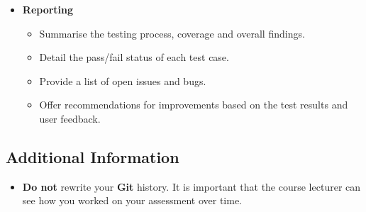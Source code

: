 \documentclass{article}
\begin{document}
\begin{itemize}
    \item \textbf{Reporting}
    \begin{itemize}
        \item Summarise the testing process, coverage and overall findings.
        \item Detail the pass/fail status of each test case.
        \item Provide a list of open issues and bugs.
        \item Offer recommendations for improvements based on the test results and user feedback.
    \end{itemize}

\end{itemize}

\subsection*{Additional Information}
\begin{itemize}
    \item \textbf{Do not} rewrite your \textbf{Git} history. It is important that the course lecturer can see how you worked on your assessment over time. 
\end{itemize}
\end{document}
